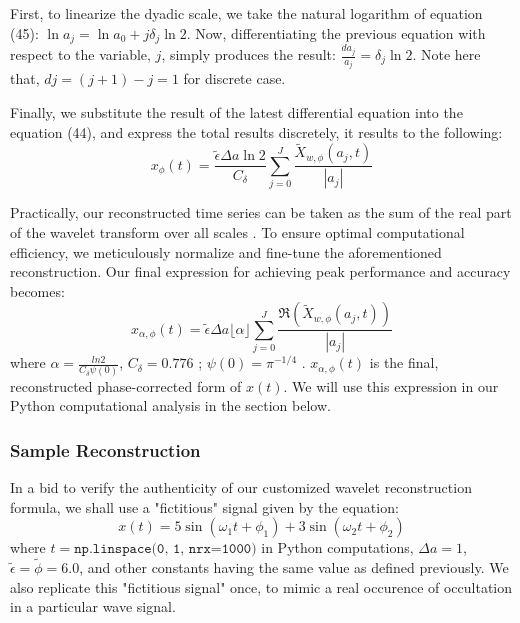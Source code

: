 \documentclass{article}
\begin{document}
First, to linearize the dyadic scale, we take the natural logarithm of equation (45): $\ln a_{j} = \ln a_{0} + j\delta_{j} \ln2$. Now, differentiating the previous equation with respect to the variable, $j$, simply produces the result: $\frac{da_j}{a_j} = \delta_{j} \ln2$. Note here that, $dj = (j+1)-j= 1$ for discrete case. 

Finally, we substitute the result of the latest differential equation into the equation (44), and express the total results discretely, it results to the following:
\begin{equation}
x_{\phi}(t) = \frac{\tilde{\epsilon}\Delta a\ln 2}{C_{\delta}} \sum_{j=0}^{J} \frac{\tilde{X}_{w,\phi}(a_{j},t)}{|a_{j}|}
\end{equation}

Practically, our reconstructed time series can be taken as the sum
of the real part of the wavelet transform over all scales \cite{APracticalGuidetoWaveletAnalysis}. To ensure optimal computational efficiency, we meticulously normalize and fine-tune the aforementioned reconstruction. Our final expression for achieving peak performance and accuracy becomes: 
\begin{equation}
 x_{\alpha,\phi}(t) = \tilde{\epsilon}\Delta a\lfloor \alpha \rfloor\sum_{j=0}^{J} \frac{\Re (\tilde{X}_{w,\phi}(a_{j},t))}{|a_{j}|}
\end{equation}
where $\alpha=\frac{ln2}{C_{\delta}\psi(0)}$, $C_{\delta}= 0.776$ \cite{APracticalGuidetoWaveletAnalysis}; $\psi(0)=\pi^{-1/4}$ \cite{APracticalGuidetoWaveletAnalysis}.
$x_{\alpha,\phi}(t)$ is the final, reconstructed phase-corrected form of $x(t)$. We will use this expression in our Python computational analysis in the section below. 

\subsubsection{Sample Reconstruction}
In a bid to verify the authenticity of our customized wavelet reconstruction formula, we shall use a "fictitious" signal given by the equation:
\begin{equation}
   x(t) = 5\sin(\omega_1 t + \phi_1) + 3\sin(\omega_2 t + \phi_2)
\end{equation}
where $t = \texttt{np.linspace(0, 1, nrx=1000)}$ in Python computations, $\Delta a=1$, $\tilde{\epsilon}=\tilde{\phi} = 6.0$, and other constants having the same value as defined previously. We also replicate this "fictitious signal" once, to mimic a real occurence of occultation in a particular wave signal.
\end{document}
